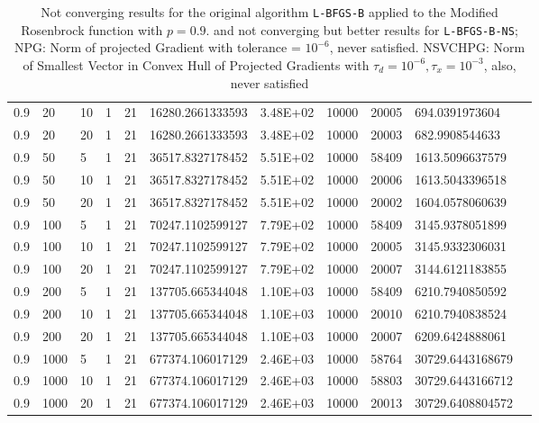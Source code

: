 \begin{table}
\begin{center}
\begin{tabular}{|l|l|l|l|l|l|l|l|l|l|l|}
      0.9 & 20 & 10 & 1 & 21 & 16280.2661333593 & 3.48E+02 & 10000 & 20005 & 694.0391973604 & \\
      0.9 & 20 & 20 & 1 & 21 & 16280.2661333593 & 3.48E+02 & 10000 & 20003 & 682.9908544633 & \\
      0.9 & 50 & 5 & 1 & 21 & 36517.8327178452 & 5.51E+02 & 10000 & 58409 & 1613.5096637579 & \\
      0.9 & 50 & 10 & 1 & 21 & 36517.8327178452 & 5.51E+02 & 10000 & 20006 & 1613.5043396518 & \\
      0.9 & 50 & 20 & 1 & 21 & 36517.8327178452 & 5.51E+02 & 10000 & 20002 & 1604.0578060639 & \\
      0.9 & 100 & 5 & 1 & 21 & 70247.1102599127 & 7.79E+02 & 10000 & 58409 & 3145.9378051899 & \\
      0.9 & 100 & 10 & 1 & 21 & 70247.1102599127 & 7.79E+02 & 10000 & 20005 & 3145.9332306031 & \\
      0.9 & 100 & 20 & 1 & 21 & 70247.1102599127 & 7.79E+02 & 10000 & 20007 & 3144.6121183855 & \\
      0.9 & 200 & 5 & 1 & 21 & 137705.665344048 & 1.10E+03 & 10000 & 58409 & 6210.7940850592 & \\
      0.9 & 200 & 10 & 1 & 21 & 137705.665344048 & 1.10E+03 & 10000 & 20010 & 6210.7940838524 & \\
      0.9 & 200 & 20 & 1 & 21 & 137705.665344048 & 1.10E+03 & 10000 & 20007 & 6209.6424888061 & \\
      0.9 & 1000 & 5 & 1 & 21 & 677374.106017129 & 2.46E+03 & 10000 & 58764 & 30729.6443168679 & \\
      0.9 & 1000 & 10 & 1 & 21 & 677374.106017129 & 2.46E+03 & 10000 & 58803 & 30729.6443166712 & \\
      0.9 & 1000 & 20 & 1 & 21 & 677374.106017129 & 2.46E+03 & 10000 & 20013 & 30729.6408804572 & \\
      \hline
    \end{tabular}
    \caption[A value where \texttt{L-BFGS-B-NS} is supposed to fail. $p = 0.9$]{Not converging results for the original algorithm \texttt{L-BFGS-B} applied to the Modified Rosenbrock function with $p = 0.9$.  and not converging but better results for \texttt{L-BFGS-B-NS}; NPG: Norm of projected Gradient with tolerance = $10^{-6}$, never satisfied. NSVCHPG: Norm of Smallest Vector in Convex Hull of Projected Gradients with $\tau_d = 10^{-6}, \tau_x = 10^{-3}$, also, never satisfied}
    \label{p09}
  \end{center}
\end{table}

\pagebreak
\pagebreak
\clearpage
